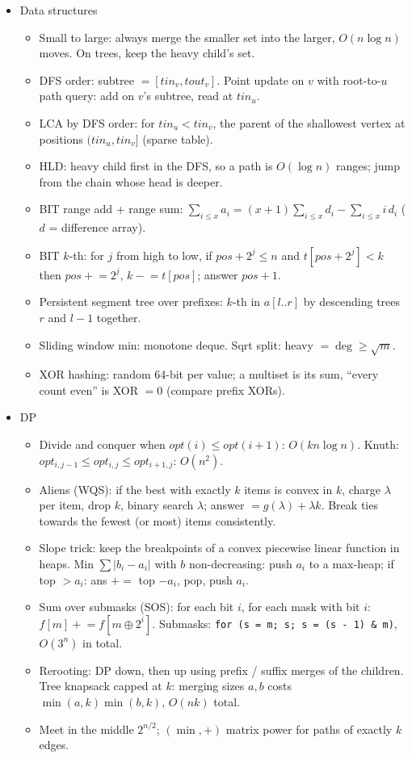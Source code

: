 \begin{itemize}
\item Data structures
\begin{itemize}
  \item Small to large: always merge the smaller set into the larger, $O(n \log n)$ moves. On trees, keep the heavy child's set.
  \item DFS order: subtree $= [tin_v, tout_v]$. Point update on $v$ with root-to-$u$ path query: add on $v$'s subtree, read at $tin_u$.
  \item LCA by DFS order: for $tin_u < tin_v$, the parent of the shallowest vertex at positions $(tin_u, tin_v]$ (sparse table).
  \item HLD: heavy child first in the DFS, so a path is $O(\log n)$ ranges; jump from the chain whose head is deeper.
  \item BIT range add + range sum: $\sum_{i \le x} a_i = (x + 1)\sum_{i \le x} d_i - \sum_{i \le x} i\, d_i$ ($d$ = difference array).
  \item BIT $k$-th: for $j$ from high to low, if $pos + 2^j \le n$ and $t[pos + 2^j] < k$ then $pos \mathrel{+}= 2^j$, $k \mathrel{-}= t[pos]$; answer $pos + 1$.
  \item Persistent segment tree over prefixes: $k$-th in $a[l..r]$ by descending trees $r$ and $l - 1$ together.
  \item Sliding window min: monotone deque. Sqrt split: heavy $= \deg \ge \sqrt m$.
  \item XOR hashing: random 64-bit per value; a multiset is its sum, ``every count even'' is XOR $= 0$ (compare prefix XORs).
\end{itemize}

\item DP
\begin{itemize}
  \item Divide and conquer when $opt(i) \le opt(i + 1)$: $O(kn\log n)$. Knuth: $opt_{i,j-1} \le opt_{i,j} \le opt_{i+1,j}$: $O(n^2)$.
  \item Aliens (WQS): if the best with exactly $k$ items is convex in $k$, charge $\lambda$ per item, drop $k$, binary search $\lambda$; answer $= g(\lambda) + \lambda k$. Break ties towards the fewest (or most) items consistently.
  \item Slope trick: keep the breakpoints of a convex piecewise linear function in heaps. Min $\sum|b_i - a_i|$ with $b$ non-decreasing: push $a_i$ to a max-heap; if top $> a_i$: ans $\mathrel{+}=$ top $- a_i$, pop, push $a_i$.
  \item Sum over submasks (SOS): for each bit $i$, for each mask with bit $i$: $f[m] \mathrel{+}= f[m \oplus 2^i]$. Submasks: \texttt{for (s = m; s; s = (s - 1) \& m)}, $O(3^n)$ in total.
  \item Rerooting: DP down, then up using prefix / suffix merges of the children. Tree knapsack capped at $k$: merging sizes $a, b$ costs $\min(a,k)\min(b,k)$, $O(nk)$ total.
  \item Meet in the middle $2^{n/2}$; $(\min, +)$ matrix power for paths of exactly $k$ edges.
\end{itemize}


\end{itemize}
